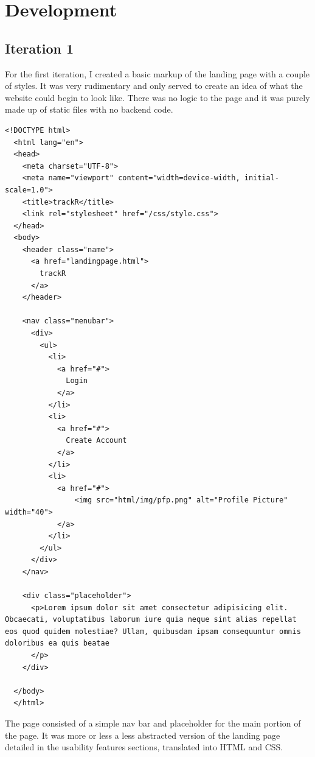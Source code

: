 \documentclass{article}
\begin{document}
\newpage

\section{Development}

\subsection{Iteration 1}

For the first iteration, I created a basic markup of the landing page with a couple of styles. It was very rudimentary and only served to create an idea of what the website could begin to look like. There was no logic to the page and it was purely made up of static files with no backend code. 

\begin{lstlisting}[caption={index.html}]
  <!DOCTYPE html>
  <html lang="en">
  <head>
    <meta charset="UTF-8">
    <meta name="viewport" content="width=device-width, initial-scale=1.0">
    <title>trackR</title>
    <link rel="stylesheet" href="/css/style.css">
  </head>
  <body>
    <header class="name">
      <a href="landingpage.html">
        trackR
      </a>
    </header>
  
    <nav class="menubar">
      <div>
        <ul>
          <li>
            <a href="#">
              Login
            </a>
          </li>
          <li>
            <a href="#">
              Create Account
            </a>
          </li>
          <li>
            <a href="#">
                <img src="html/img/pfp.png" alt="Profile Picture" width="40">
            </a>
          </li>
        </ul>
      </div>
    </nav>
  
    <div class="placeholder">
      <p>Lorem ipsum dolor sit amet consectetur adipisicing elit. Obcaecati, voluptatibus laborum iure quia neque sint alias repellat eos quod quidem molestiae? Ullam, quibusdam ipsam consequuntur omnis doloribus ea quis beatae
      </p>
    </div>
  
  </body>
  </html>
\end{lstlisting}

The page consisted of a simple nav bar and placeholder for the main portion of the page. It was more or less a less abstracted version of the landing page detailed in the usability features sections, translated into HTML and CSS.
\end{document}

